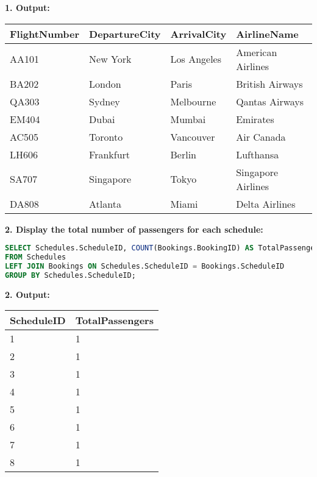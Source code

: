 \documentclass[14pt,a4paper]{extarticle}
\begin{document}
    \textbf{1. Output:}
\begin{table}[h!]
\centering
\begin{tabular}{|l|l|l|l|}
\hline
\textbf{FlightNumber} & \textbf{DepartureCity} & \textbf{ArrivalCity} & \textbf{AirlineName}      \\ \hline
AA101                 & New York               & Los Angeles          & American Airlines        \\ \hline
BA202                 & London                 & Paris                & British Airways          \\ \hline
QA303                 & Sydney                 & Melbourne            & Qantas Airways           \\ \hline
EM404                 & Dubai                  & Mumbai               & Emirates                 \\ \hline
AC505                 & Toronto                & Vancouver            & Air Canada               \\ \hline
LH606                 & Frankfurt              & Berlin               & Lufthansa                \\ \hline
SA707                 & Singapore              & Tokyo                & Singapore Airlines       \\ \hline
DA808                 & Atlanta                & Miami                & Delta Airlines           \\ \hline
\end{tabular}
\end{table}

    \textbf{2. Display the total number of passengers for each schedule:}
    \begin{lstlisting}[language=SQL, upquote=true]
SELECT Schedules.ScheduleID, COUNT(Bookings.BookingID) AS TotalPassengers
FROM Schedules
LEFT JOIN Bookings ON Schedules.ScheduleID = Bookings.ScheduleID
GROUP BY Schedules.ScheduleID;
    \end{lstlisting}
    
    \textbf{2. Output:}
\begin{table}[h!]
\centering
\begin{tabular}{|l|l|}
\hline
\textbf{ScheduleID} & \textbf{TotalPassengers} \\ \hline
1                   & 1                        \\ \hline
2                   & 1                        \\ \hline
3                   & 1                        \\ \hline
4                   & 1                        \\ \hline
5                   & 1                        \\ \hline
6                   & 1                        \\ \hline
7                   & 1                        \\ \hline
8                   & 1                        \\ \hline
\end{tabular}
\end{table}
\end{document}
